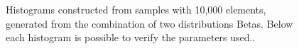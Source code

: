 \documentclass[10pt]{article}
\begin{document}
\begin{figure}[h]
{  }
  \caption{Histograms constructed from samples with 10,000 elements, generated from the combination of two distributions Betas. Below each histogram is possible to verify the parameters used..}
  \label{fig:02A}
\end{figure}
\end{document}
